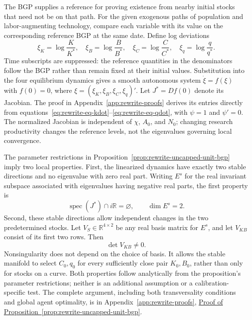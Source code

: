 The BGP supplies a reference for proving existence from nearby initial
stocks that need not be on that path. For the given exogenous paths of
population and labor-augmenting technology, compare each variable with its
value on the corresponding reference BGP at the same date. Define log deviations
\begin{equation}
 \xi_K=\log\frac K{K^*},\quad
 \xi_B=\log\frac B{B^*},\quad
 \xi_C=\log\frac C{C^*},\quad
 \xi_q=\log\frac q{q^*}.
 \label{eq:rewrite-uncapped-unit-deviations}
\end{equation}
Time subscripts are suppressed: the reference quantities in the denominators
follow the BGP rather than remain fixed at their initial values.
Substitution into the four equilibrium dynamics gives a smooth autonomous
system $\dot\xi=f(\xi)$ with $f(0)=0$, where
$\xi=(\xi_K,\xi_B,\xi_C,\xi_q)'$. Let $J^*=Df(0)$ denote its Jacobian.
The proof in Appendix~\ref{app:rewrite-proofs} derives its entries directly from
equations~\eqref{eq:rewrite-eq-kdot}--\eqref{eq:rewrite-eq-qdot}, with
$\psi=1$ and $\psi'=0$.
The normalized Jacobian is independent of $\chi$, $A_0$, and $N_0$;
changing research productivity changes the reference levels, not the
eigenvalues governing local convergence.

The parameter restrictions in Proposition~\ref{prop:rewrite-uncapped-unit-bgp}
imply two local properties. First, the linearized dynamics have exactly two stable
directions and no eigenvalue with zero real part. Writing $E^s$ for the real
invariant subspace associated with eigenvalues having negative real parts,
the first property is
\begin{equation}
 \operatorname{spec}(J^*)\cap i\mathbb R=\varnothing,
 \qquad \dim E^s=2.
 \label{eq:rewrite-uncapped-unit-local-spectrum}
\end{equation}
Second, these stable directions allow independent changes in the two
predetermined stocks. Let $V_S\in\mathbb R^{4\times2}$ be any real basis
matrix for $E^s$, and let $V_{KB}$ consist of its first two rows. Then
\begin{equation}
 \det V_{KB}\ne0.
 \label{eq:rewrite-uncapped-unit-local-projection}
\end{equation}
Nonsingularity does not depend on the choice of basis. It allows the stable
manifold to select $C_0,q_0$ for every sufficiently close pair $K_0,B_0$,
rather than only for stocks on a curve. Both properties follow analytically
from the proposition's parameter restrictions; neither is an additional
assumption or a calibration-specific test. The complete argument, including both transversality
conditions and global agent optimality, is in Appendix~\ref{app:rewrite-proofs},
\hyperref[proof:rewrite-uncapped-unit-local]{Proof of
Proposition~\ref*{prop:rewrite-uncapped-unit-bgp}}.

